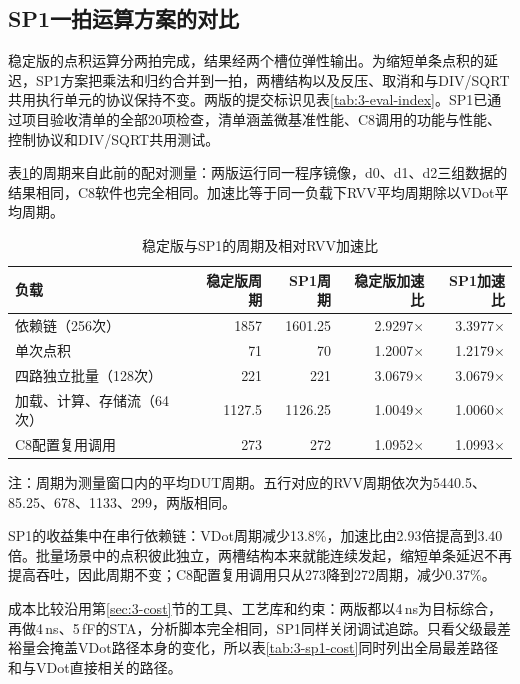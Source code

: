 \subsection{SP1一拍运算方案的对比}\label{subsec:3-sp1-comparison}
稳定版的点积运算分两拍完成，结果经两个槽位弹性输出。为缩短单条点积的延迟，SP1方案把乘法和归约合并到一拍，两槽结构以及反压、取消和与DIV/SQRT共用执行单元的协议保持不变。两版的提交标识见表\ref{tab:3-eval-index}。SP1已通过项目验收清单的全部20项检查，清单涵盖微基准性能、C8调用的功能与性能、控制协议和DIV/SQRT共用测试。

表\ref{tab:3-sp1-performance}的周期来自此前的配对测量：两版运行同一程序镜像，d0、d1、d2三组数据的结果相同，C8软件也完全相同。加速比等于同一负载下RVV平均周期除以VDot平均周期。

\begin{table}[!htbp]\centering
\small\setlength{\tabcolsep}{5pt}
\caption{稳定版与SP1的周期及相对RVV加速比}\label{tab:3-sp1-performance}
\begin{tabular}{lrrrr}
\toprule
负载 & 稳定版周期 & SP1周期 & 稳定版加速比 & SP1加速比\\
\midrule
依赖链（256次） & 1857 & 1601.25 & 2.9297$\times$ & 3.3977$\times$\\
单次点积 & 71 & 70 & 1.2007$\times$ & 1.2179$\times$\\
四路独立批量（128次） & 221 & 221 & 3.0679$\times$ & 3.0679$\times$\\
加载、计算、存储流（64次） & 1127.5 & 1126.25 & 1.0049$\times$ & 1.0060$\times$\\
C8配置复用调用 & 273 & 272 & 1.0952$\times$ & 1.0993$\times$\\
\bottomrule
\end{tabular}
\par\smallskip
\begin{minipage}{0.96\linewidth}\footnotesize
注：周期为测量窗口内的平均DUT周期。五行对应的RVV周期依次为5440.5、85.25、678、1133、299，两版相同。
\end{minipage}
\end{table}

SP1的收益集中在串行依赖链：VDot周期减少13.8\%，加速比由2.93倍提高到3.40倍。批量场景中的点积彼此独立，两槽结构本来就能连续发起，缩短单条延迟不再提高吞吐，因此周期不变；C8配置复用调用只从273降到272周期，减少0.37\%。

成本比较沿用第\ref{sec:3-cost}节的工具、工艺库和约束：两版都以4\,ns为目标综合，再做4\,ns、5\,fF的STA，分析脚本完全相同，SP1同样关闭调试追踪。只看父级最差裕量会掩盖VDot路径本身的变化，所以表\ref{tab:3-sp1-cost}同时列出全局最差路径和与VDot直接相关的路径。

